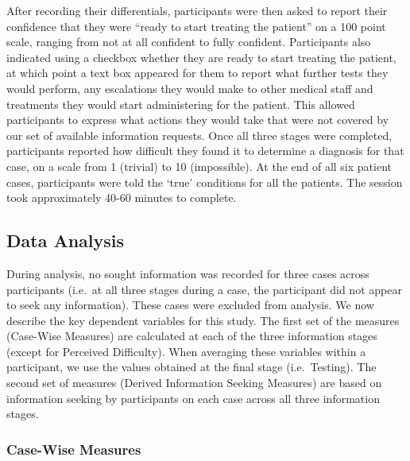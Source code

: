 \documentclass[a4paper, nobind]{templates/ociamthesis}
\begin{document}
After recording their differentials, participants were then asked to report their confidence that they were ``ready to start treating the patient'' on a 100 point scale, ranging from not at all confident to fully confident. Participants also indicated using a checkbox whether they are ready to start treating the patient, at which point a text box appeared for them to report what further tests they would perform, any escalations they would make to other medical staff and treatments they would start administering for the patient. This allowed participants to express what actions they would take that were not covered by our set of available information requests. Once all three stages were completed, participants reported how difficult they found it to determine a diagnosis for that case, on a scale from 1 (trivial) to 10 (impossible). At the end of all six patient cases, participants were told the `true' conditions for all the patients. The session took approximately 40-60 minutes to complete.

\subsection{Data Analysis}\label{data-analysis}

During analysis, no sought information was recorded for three cases across participants (i.e.~at all three stages during a case, the participant did not appear to seek any information). These cases were excluded from analysis. We now describe the key dependent variables for this study. The first set of the measures (Case-Wise Measures) are calculated at each of the three information stages (except for Perceived Difficulty). When averaging these variables within a participant, we use the values obtained at the final stage (i.e.~Testing). The second set of measures (Derived Information Seeking Measures) are based on information seeking by participants on each case across all three information stages.

\subsubsection{Case-Wise Measures}\label{case-wise-measures}
\end{document}
